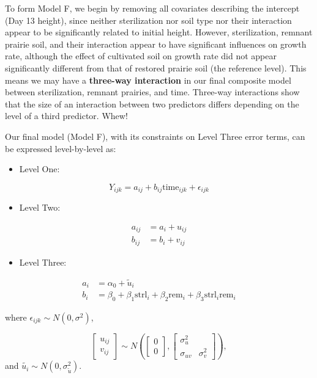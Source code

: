 \documentclass[
]{krantz}
\providecommand{\tightlist}{%
  \setlength{\itemsep}{0pt}\setlength{\parskip}{0pt}}
\begin{document}
To form Model F, we begin by removing all covariates describing the intercept (Day 13 height), since neither sterilization nor soil type nor their interaction appear to be significantly related to initial height. However, sterilization, remnant prairie soil, and their interaction appear to have significant influences on growth rate, although the effect of cultivated soil on growth rate did not appear significantly different from that of restored prairie soil (the reference level). This means we may have a \textbf{three-way interaction}  in our final composite model between sterilization, remnant prairies, and time. Three-way interactions show that the size of an interaction between two predictors differs depending on the level of a third predictor. Whew!

Our final model (Model F), with its constraints on Level Three error terms, can be expressed level-by-level as:

\begin{itemize}
\tightlist
\item
  Level One:
\end{itemize}

\begin{equation*}
Y_{ijk} = a_{ij}+b_{ij}\textrm{time}_{ijk}+\epsilon_{ijk}
\end{equation*}

\begin{itemize}
\tightlist
\item
  Level Two:
\end{itemize}

\begin{align*}
a_{ij} & = a_{i}+u_{ij} \\
b_{ij} & = b_{i}+v_{ij}
\end{align*}

\begin{itemize}
\tightlist
\item
  Level Three:
\end{itemize}

\begin{align*}
a_{i} & = \alpha_{0} + \tilde{u}_{i} \\
b_{i} & = \beta_{0}+\beta_{1}\textrm{strl}_{i}+\beta_{2}\textrm{rem}_{i} + \beta_{3}\textrm{strl}_{i}\textrm{rem}_{i}
\end{align*}

where \(\epsilon_{ijk}\sim N(0,\sigma^2)\),

\[ \left[ \begin{array}{c}
            u_{ij} \\ v_{ij}
          \end{array}  \right] \sim N \left( \left[
          \begin{array}{c}
            0 \\ 0
          \end{array} \right], \left[
          \begin{array}{cc}
            \sigma_{u}^{2} & \\
            \sigma_{uv} & \sigma_{v}^{2}
          \end{array} \right] \right), \]
and \(\tilde{{u}_{i}}\sim N(0,\sigma_{\tilde{u}}^{2})\).
\end{document}
